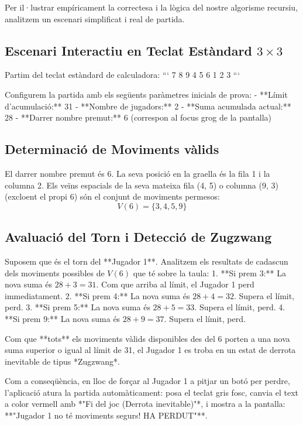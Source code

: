 \documentclass[compsoc, a4paper]{IEEEtran}
\begin{document}
Per il·lustrar empíricament la correctesa i la lògica del nostre algorisme recursiu, analitzem un escenari simplificat i real de partida.

\subsection{Escenari Interactiu en Teclat Estàndard $3 \times 3$}

Partim del teclat estàndard de calculadora:
```
7  8  9
4  5  6
1  2  3
```

Configurem la partida amb els següents paràmetres inicials de prova:
- **Límit d'acumulació:** 31
- **Nombre de jugadors:** 2
- **Suma acumulada actual:** 28
- **Darrer nombre premut:** 6 (correspon al focus grog de la pantalla)

\subsection{Determinació de Moviments vàlids}
El darrer nombre premut és 6. La seva posició en la graella és la fila 1 i la columna 2. Els veïns espacials de la seva mateixa fila (4, 5) o columna (9, 3) (excloent el propi 6) són el conjunt de moviments permesos:
$$V(6) = \{3, 4, 5, 9\}$$

\subsection{Avaluació del Torn i Detecció de Zugzwang}
Suposem que és el torn del **Jugador 1**. Analitzem els resultats de cadascun dels moviments possibles de $V(6)$ que té sobre la taula:
1. **Si prem 3:** La nova suma és $28 + 3 = 31$. Com que arriba al límit, el Jugador 1 perd immediatament.
2. **Si prem 4:** La nova suma és $28 + 4 = 32$. Supera el límit, perd.
3. **Si prem 5:** La nova suma és $28 + 5 = 33$. Supera el límit, perd.
4. **Si prem 9:** La nova suma és $28 + 9 = 37$. Supera el límit, perd.

Com que **tots** els moviments vàlids disponibles des del 6 porten a una nova suma superior o igual al límit de 31, el Jugador 1 es troba en un estat de derrota inevitable de tipus *Zugzwang*. 

Com a conseqüència, en lloc de forçar al Jugador 1 a pitjar un botó per perdre, l'aplicació atura la partida automàticament: posa el teclat gris fosc, canvia el text a color vermell amb *"Fi del joc (Derrota inevitable)"*, i mostra a la pantalla:
**"Jugador 1 no té moviments segurs! HA PERDUT"**.
\end{document}
